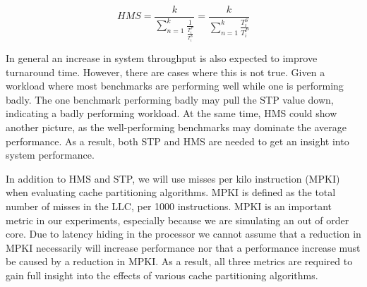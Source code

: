 \begin{equation} \label{eq:HMS}
 {HMS} = \frac{k}{{\sum\limits_{n=1}^{k}\frac{1}{\frac{T^{P}_i}{T^{S}_i}}}} = \frac{k}{{\sum\limits_{n=1}^{k}\frac{T^{S}_i}{T^{P}_i}}}
\end{equation}

In general an increase in system throughput is also expected to improve turnaround time.
However, there are cases where this is not true.
Given a workload where most benchmarks are performing well while one is performing badly.
The one benchmark performing badly may pull the STP value down, indicating a badly performing workload.
At the same time, HMS could show another picture, as the well-performing benchmarks may dominate the average performance.
As a result, both STP and HMS are needed to get an insight into system performance.

In addition to HMS and STP, we will use misses per kilo instruction (MPKI) when evaluating cache partitioning algorithms.
MPKI is defined as the total number of misses in the LLC, per 1000 instructions.
MPKI is an important metric in our experiments, especially because we are simulating an out of order core. 
Due to latency hiding in the processor we cannot assume that a reduction in MPKI necessarily will increase performance nor that a performance increase must be caused by a reduction in MPKI.
As a result, all three metrics are required to gain full insight into the effects of various cache partitioning algorithms.